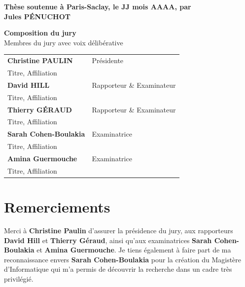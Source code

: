 \documentclass[english,12pt,a4paper]{book}
\begin{document}
\begin{titlepage}
\textbf{Thèse soutenue à Paris-Saclay, le JJ mois AAAA, par}\\
\bigskip
\Large {\color{Prune} \textbf{Jules P\'ENUCHOT}} %

\vspace{\fill} %

\bigskip

\flushleft
\small {\color{Prune} \textbf{Composition du jury}}\\
{\color{Prune} \scriptsize {Membres du jury avec voix délibérative}} \\
\vspace{2mm}
\scriptsize
\begin{tabular}{|p{7cm}l}
\arrayrulecolor{Prune}
\textbf{Christine PAULIN} &   Présidente \\
Titre, Affiliation & \\
\textbf{David HILL} & Rapporteur \& Examinateur \\
Titre, Affiliation   & \\
\textbf{Thierry G\'ERAUD} & Rapporteur \& Examinateur \\
Titre, Affiliation  &   \\
\textbf{Sarah Cohen-Boulakia} & Examinatrice \\
Titre, Affiliation   &   \\
\textbf{Amina Guermouche} & Examinatrice \\
Titre, Affiliation   &   \\

\end{tabular}

\end{titlepage}

\chapter*{Remerciements}

Merci \`a \textbf{Christine Paulin} d'assurer la pr\'esidence du jury,
aux rapporteurs \textbf{David Hill} et \textbf{Thierry G\'eraud},
ainsi qu'aux examinatrices \textbf{Sarah Cohen-Boulakia}
et \textbf{Amina Guermouche}.
Je tiens \'egalement \`a faire part de ma reconnaissance envers
\textbf{Sarah Cohen-Boulakia} pour la cr\'eation du Magist\`ere d'Informatique
qui m'a permis de d\'ecouvrir la recherche dans un cadre tr\`es privil\'egi\'e.
\end{document}
